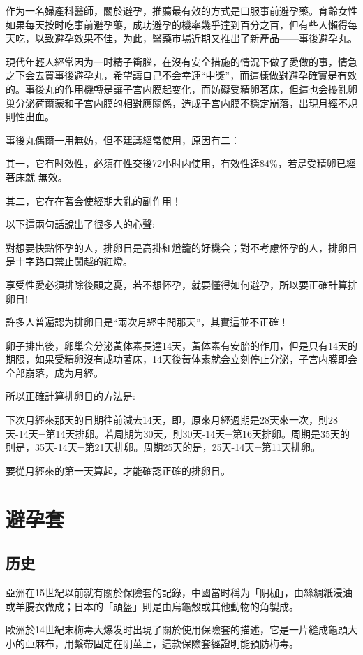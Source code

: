 \documentclass[12pt,UTF8]{ctexbook}
\begin{document}
作为一名婦產科醫師，關於避孕，推薦最有效的方式是口服事前避孕藥。育齡女性如果每天按时吃事前避孕藥，成功避孕的機率幾乎達到百分之百，但有些人懶得每天吃，以致避孕效果不佳，为此，醫藥市場近期又推出了新產品——事後避孕丸。

現代年輕人經常因为一时精子衝腦，在沒有安全措施的情況下做了愛做的事，情急之下会去買事後避孕丸，希望讓自己不会幸運“中獎”，而這樣做對避孕確實是有效的。事後丸的作用機轉是讓子宫内膜起变化，而妨礙受精卵著床，但這也会擾亂卵巢分泌荷爾蒙和子宫内膜的相對應關係，造成子宫内膜不穩定崩落，出現月經不規則性出血。

事後丸偶爾一用無妨，但不建議經常使用，原因有二：

其一，它有时效性，必須在性交後72小时内使用，有效性達84\%，若是受精卵已經著床就
無效。

其二，它存在著会使經期大亂的副作用！

以下這兩句話說出了很多人的心聲:

對想要快點怀孕的人，排卵日是高掛紅燈籠的好機会；對不考慮怀孕的人，排卵日是十字路口禁止闖越的紅燈。

享受性愛必須排除後顧之憂，若不想怀孕，就要懂得如何避孕，所以要正確計算排卵日!

許多人普遍認为排卵日是“兩次月經中間那天”，其實這並不正確！

卵子排出後，卵巢会分泌黃体素長達14天，黃体素有安胎的作用，但是只有14天的期限，如果受精卵沒有成功著床，14天後黃体素就会立刻停止分泌，子宫内膜即会全部崩落，成为月經。

所以正確計算排卵日的方法是:

下次月經來那天的日期往前減去14天，即，原來月經週期是28天來一次，則28天-14天=第14天排卵。若周期为30天，則30天-14天=第16天排卵。周期是35天的則是，35天-14天=第21天排卵。周期25天的是，25天-14天=第11天排卵。

要從月經來的第一天算起，才能確認正確的排卵日。

\section{避孕套}

\subsection{历史}

亞洲在15世紀以前就有關於保險套的記錄，中國當时稱为「阴枷」，由絲綢紙浸油或羊腸衣做成；日本的「頭盔」則是由烏龜殼或其他動物的角製成。

歐洲於14世紀末梅毒大爆发时出現了關於使用保險套的描述，它是一片縫成龜頭大小的亞麻布，用繫帶固定在阴莖上，這款保險套經證明能預防梅毒。
\end{document}
